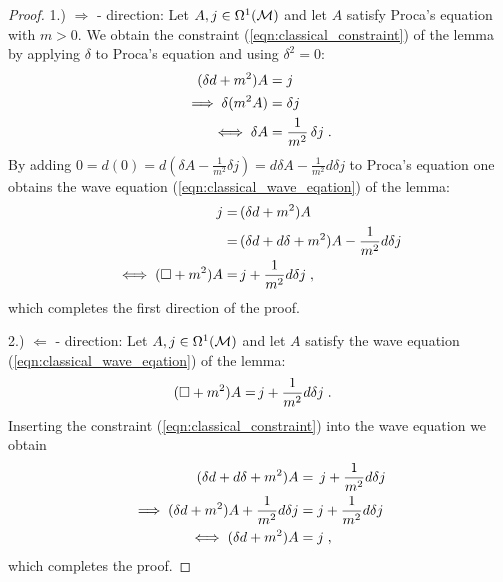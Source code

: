 %
\begin{proof}
1.) $\Rightarrow$ - direction: Let $A, j \in \Omega^1(\mathcal{M})$ and let $A$ satisfy Proca's equation with $m >0$. We obtain the constraint (\ref{eqn:classical_constraint}) of the lemma by applying $\delta$ to Proca's equation and using $\delta^2 = 0$:
\begin{align}
(\delta d +m^2) A 		&= j \notag \\
\implies 			\delta(m^2 A) 				&= \delta j  \notag \\
\iff 		\delta A 							&= \frac{1}{m^2} \, \delta j \;.
\end{align}
By adding $0=d(0) = d(\delta A - \frac{1}{m^2}\delta j) = d\delta A - \frac{1}{m^2}d\delta j$ to Proca's equation one obtains the wave equation (\ref{eqn:classical_wave_eqation}) of the lemma:
\begin{align}
j =& \, (\delta d +m^2) A \notag \\
=& \, (\delta d + d \delta +m^2) A -\frac{1}{m^2} d \delta j \notag \\
\iff (\square +m^2)A =& \, j+ \frac{1}{m^2}d\delta j \;,
\end{align}
which completes the first direction of the proof.  \par
%
%
2.) $\Leftarrow$ - direction:
Let $A, j \in \Omega^1(\mathcal{M})$ and let $A$ satisfy the wave equation (\ref{eqn:classical_wave_eqation}) of the lemma:
\begin{align}
(\square +m^2)A =& \, j+ \frac{1}{m^2}d\delta j \;.
\end{align}
Inserting the constraint (\ref{eqn:classical_constraint}) into the wave equation we obtain
\begin{align}
 (\delta d + d \delta +m^2) A &= \, j + \frac{1}{m^2} d \delta j \notag  \\
 \implies (\delta d +m^2) A + \frac{1}{m^2} d \delta j  &= j + \frac{1}{m^2} d \delta j \notag \\
 \iff (\delta d +m^2) A  &= j  \;,
\end{align}
which completes the proof.
\end{proof}
